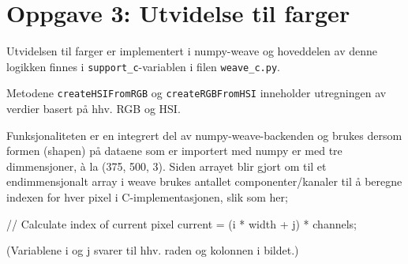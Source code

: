 \section*{Oppgave 3: Utvidelse til farger}

Utvidelsen til farger er implementert i numpy-weave og hoveddelen av denne logikken finnes i \verb;support_c;-variablen i filen \verb;weave_c.py;.

Metodene \verb;createHSIFromRGB; og \verb;createRGBFromHSI; inneholder utregningen av verdier basert på hhv. RGB og HSI.

Funksjonaliteten er en integrert del av numpy-weave-backenden og brukes dersom formen (shapen) på dataene som er importert med numpy er med tre dimmensjoner, à la (375, 500, 3). Siden arrayet blir gjort om til et endimmensjonalt array i weave brukes antallet componenter/kanaler til å beregne indexen for hver pixel i C-implementasjonen, slik som her;

// Calculate index of current pixel
current = (i * width + j) * channels;

(Variablene i og j svarer til hhv. raden og kolonnen i bildet.)